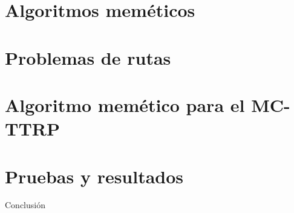 \documentclass[aspectratio=169,table,xcdraw]{beamer}
\begin{document}
\section{Algoritmos meméticos}

\section{Problemas de rutas}

\section{Algoritmo memético para el MC-TTRP}

\section{Pruebas y resultados}

\begin{frame}{Conclusión}
    
\end{frame}
\end{document}
